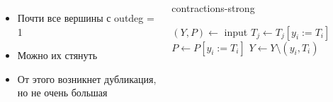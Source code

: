 \documentclass{beamer}
\begin{document}
\begin{frame}
\begin{columns}
  \begin{itemize}
    \item Почти все вершины с outdeg = 1
    \item Можно их стянуть
    \item От этого возникнет дубликация, но не очень большая
  \end{itemize}
\begin{megaalgorithm}\tiny
  \caption{\tiny contractions-strong}
\begin{algorithmic}
  \State $(Y, P)\gets$ input
      \If{\textcolor{red}{$outdeg(y_i) = 1$}}
              \State $T_j \gets T_j [y_i := T_i]$
          \EndFor
          \State $P \gets P [y_i := T_i]$
          \State $Y\gets Y \setminus (y_i, T_i)$
      \EndIf
  \EndFor
  \State {}
\end{algorithmic}
\end{megaalgorithm}
  \end{columns}
  \end{frame}
\end{document}
